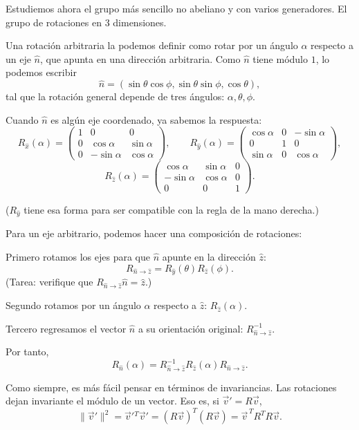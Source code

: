 \documentclass[11pt,a4paper]{article}
\newcommand{\concept}[1]{\textcolor{concept-green}{#1}}
\begin{document}
Estudiemos ahora el grupo más sencillo no abeliano y con varios generadores. El grupo de rotaciones en 3 dimensiones.

Una rotación arbitraria la podemos definir como rotar por un ángulo $\alpha$ respecto a un eje $\hat n$, que apunta en una dirección arbitraria. Como $\hat n$ tiene módulo $1$, lo podemos escribir
\[
  \hat n=(\sin\theta\cos\phi,\sin\theta\sin\phi,\cos\theta),
\]
tal que la rotación general depende de tres ángulos: $\alpha,\theta,\phi$.

Cuando $\hat n$ es algún eje coordenado, ya sabemos la respuesta:
\[
  R_{\hat x}(\alpha)=
  \begin{pmatrix}
    1&0&0\\
    0&\cos\alpha&\sin\alpha\\
    0&-\sin\alpha&\cos\alpha
  \end{pmatrix},
  \qquad
  R_{\hat y}(\alpha)=
  \begin{pmatrix}
    \cos\alpha&0&-\sin\alpha\\
    0&1&0\\
    \sin\alpha&0&\cos\alpha
  \end{pmatrix},
\]
\[
  R_{\hat z}(\alpha)=
  \begin{pmatrix}
    \cos\alpha&\sin\alpha&0\\
    -\sin\alpha&\cos\alpha&0\\
    0&0&1
  \end{pmatrix}.
\]

($R_{\hat y}$ tiene esa forma para ser compatible con la regla de la mano derecha.)

Para un eje arbitrario, podemos hacer una composición de rotaciones:

\concept{Primero} rotamos los ejes para que $\hat n$ apunte en la dirección $\hat z$:
\[
  R_{\hat n\to\hat z}=R_{\hat y}(\theta)R_{\hat z}(\phi).
\]
(Tarea: verifique que $R_{\hat n\to\hat z}\hat n=\hat z$.)

\concept{Segundo} rotamos por un ángulo $\alpha$ respecto a $\hat z$: $R_{\hat z}(\alpha)$.

\concept{Tercero} regresamos el vector $\hat n$ a su orientación original: $R_{\hat n\to\hat z}^{-1}$.

Por tanto,
\[
  R_{\hat n}(\alpha)
  =R_{\hat n\to\hat z}^{-1}
   R_{\hat z}(\alpha)
   R_{\hat n\to\hat z}.
\]

Como siempre, es más fácil pensar en términos de invariancias. Las rotaciones dejan invariante el módulo de un vector. Eso es, si $\vec v'=R\vec v$,
\[
  \lVert\vec v'\rVert^2
  =\vec v'{}^T\vec v'
  =(R\vec v)^T(R\vec v)
  =\vec v^{\,T}R^TR\vec v.
\]
\end{document}
